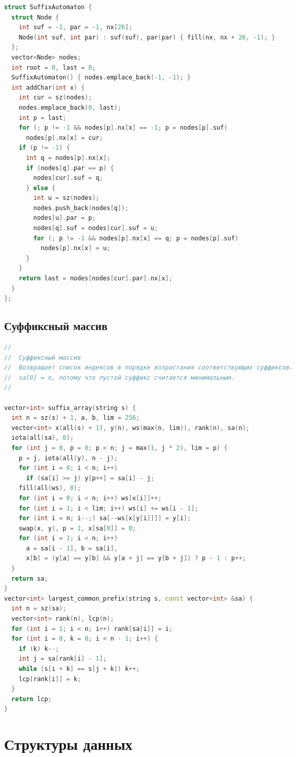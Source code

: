 \documentclass[10pt,a4paper,landscape,twosided]{extarticle}
\begin{document}
\begin{multicols}{3}
\begin{lstlisting}[language=C++]
struct SuffixAutomaton {
  struct Node {
    int suf = -1, par = -1, nx[26];
    Node(int suf, int par) : suf(suf), par(par) { fill(nx, nx + 26, -1); }
  };
  vector<Node> nodes;
  int root = 0, last = 0;
  SuffixAutomaton() { nodes.emplace_back(-1, -1); }
  int addChar(int x) {
    int cur = sz(nodes);
    nodes.emplace_back(0, last);
    int p = last;
    for (; p != -1 && nodes[p].nx[x] == -1; p = nodes[p].suf)
      nodes[p].nx[x] = cur;
    if (p != -1) {
      int q = nodes[p].nx[x];
      if (nodes[q].par == p) {
        nodes[cur].suf = q;
      } else {
        int u = sz(nodes);
        nodes.push_back(nodes[q]);
        nodes[u].par = p;
        nodes[q].suf = nodes[cur].suf = u;
        for (; p != -1 && nodes[p].nx[x] == q; p = nodes[p].suf)
          nodes[p].nx[x] = u;
      }
    }
    return last = nodes[nodes[cur].par].nx[x];
  }
};
\end{lstlisting}

\subsection{Суффиксный массив}
\begin{lstlisting}[language=C++]
//
//  Суффиксный массив
//  Возвращает список индексов в порядке возрастания соответствующих суффиксов.
//  sa[0] = n, потому что пустой суффикс считается минимальным.
//

vector<int> suffix_array(string s) {
  int n = sz(s) + 1, a, b, lim = 256;
  vector<int> x(all(s) + 1), y(n), ws(max(n, lim)), rank(n), sa(n);
  iota(all(sa), 0);
  for (int j = 0, p = 0; p < n; j = max(1, j * 2), lim = p) {
    p = j, iota(all(y), n - j);
    for (int i = 0; i < n; i++)
      if (sa[i] >= j) y[p++] = sa[i] - j;
    fill(all(ws), 0);
    for (int i = 0; i < n; i++) ws[x[i]]++;
    for (int i = 1; i < lim; i++) ws[i] += ws[i - 1];
    for (int i = n; i--;) sa[--ws[x[y[i]]]] = y[i];
    swap(x, y), p = 1, x[sa[0]] = 0;
    for (int i = 1; i < n; i++)
      a = sa[i - 1], b = sa[i],
      x[b] = (y[a] == y[b] && y[a + j] == y[b + j]) ? p - 1 : p++;
  }
  return sa;
}
vector<int> largest_common_prefix(string s, const vector<int> &sa) {
  int n = sz(sa);
  vector<int> rank(n), lcp(n);
  for (int i = 1; i < n; i++) rank[sa[i]] = i;
  for (int i = 0, k = 0; i < n - 1; i++) {
    if (k) k--;
    int j = sa[rank[i] - 1];
    while (s[i + k] == s[j + k]) k++;
    lcp[rank[i]] = k;
  }
  return lcp;
}
\end{lstlisting}

\section{Структуры данных}


\end{multicols}
\end{document}
